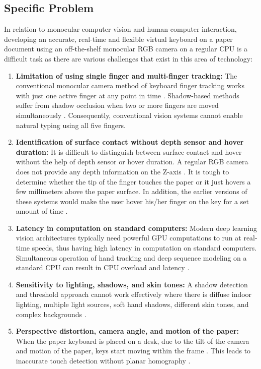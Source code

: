 \subsection{Specific Problem}
\label{subsec:specific_problem}
In relation to monocular computer vision and human-computer interaction, developing an accurate, real-time and flexible virtual keyboard on a paper document using an off-the-shelf monocular RGB camera on a regular CPU is a difficult task as there are various challenges that exist in this area of technology:
\begin{enumerate}
    \item \textbf{Limitation of using single finger and multi-finger tracking:} The conventional monocular camera method of keyboard finger tracking works with just one active finger at any point in time \cite{Thomas2013Camera, Ji2018Local, Srivastava2012RealTime}. Shadow-based methods suffer from shadow occlusion when two or more fingers are moved simultaneously \cite{Posner2012Single}. Consequently, conventional vision systems cannot enable natural typing using all five fingers.
    \item \textbf{Identification of surface contact without depth sensor and hover duration:} It is difficult to distinguish between surface contact and hover without the help of depth sensor or hover duration. A regular RGB camera does not provide any depth information on the Z-axis \cite{Thomas2013Camera, Posner2012Single}. It is tough to determine whether the tip of the finger touches the paper or it just hovers a few millimeters above the paper surface. In addition, the earlier versions of these systems would make the user hover his/her finger on the key for a set amount of time \cite{Khare2019QWERTY, Chen2024Gaze}.
    \item \textbf{Latency in computation on standard computers:} Modern deep learning vision architectures typically need powerful GPU computations to run at real-time speeds, thus having high latency in computation on standard computers. Simultaneous operation of hand tracking and deep sequence modeling on a standard CPU can result in CPU overload and latency \cite{Enkhbat2020HandKey, Ji2018Local}.
    \item \textbf{Sensitivity to lighting, shadows, and skin tones:} A shadow detection and threshold approach cannot work effectively where there is diffuse indoor lighting, multiple light sources, soft hand shadows, different skin tones, and complex backgrounds \cite{Thomas2013Camera, Yue2014Blind}.
    \item \textbf{Perspective distortion, camera angle, and motion of the paper:} When the paper keyboard is placed on a desk, due to the tilt of the camera and motion of the paper, keys start moving within the frame \cite{Wang2016AprilTag2, Oscadal2020Improved}. This leads to inaccurate touch detection without planar homography \cite{Kallwies2020Determining, Kalaitzakis2021Fiducial}.

\end{enumerate}

